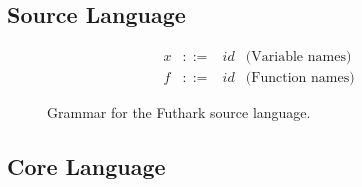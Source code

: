 \subsection{Source Language}

%
\begin{figure}
\begin{equation}
\begin{array}{lrlr}
x & ::= & id & \text{(Variable names)} \\
f & ::= & id & \text{(Function names)}
\end{array}
\end{equation}
\caption{Grammar for the Futhark source language.}
\label{fig:futhark_src}
\end{figure}
%


\subsection{Core Language}

